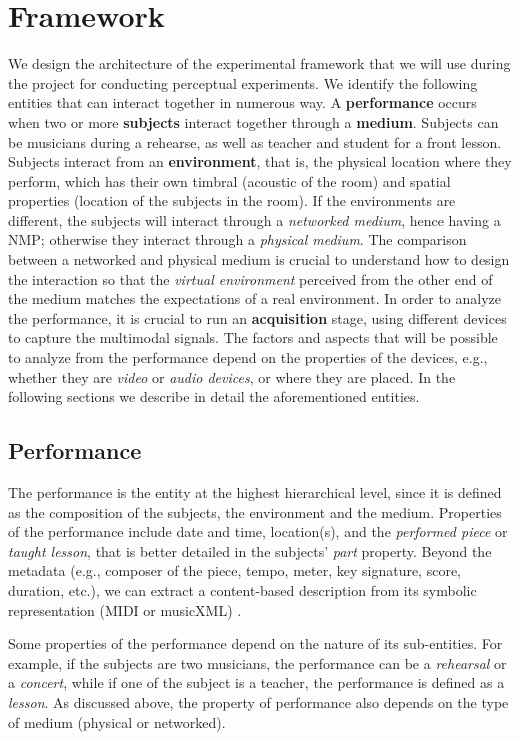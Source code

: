 \section{Framework}\label{sec:framework}
We design the architecture of the experimental framework that we will use during the project for conducting perceptual experiments. We identify the following entities that can interact together in numerous way. A \textbf{performance} occurs when two or more \textbf{subjects} interact together through a \textbf{medium}. Subjects can be musicians during a rehearse, as well as teacher and student for a front lesson. Subjects interact from an \textbf{environment}, that is, the physical location where they perform, which has their own timbral (acoustic of the room) and spatial properties (location of the subjects in the room). If the environments are different, the subjects will interact through a \textit{networked medium}, hence having a NMP; otherwise they interact through a \textit{physical medium}. The comparison between a networked and physical medium is crucial to understand how to design the interaction so that the \textit{virtual environment} perceived from the other end of the medium matches the expectations of a real environment. In order to analyze the performance, it is crucial to run an \textbf{acquisition} stage, using different devices to capture the multimodal signals. The factors and aspects that will be possible to analyze from the performance depend on the properties of the devices, e.g., whether they are \textit{video} or \textit{audio devices}, or where they are placed. In the following sections we describe in detail the aforementioned entities.

\subsection{Performance}
The performance is the entity at the highest hierarchical level, since it is defined as the composition of the subjects, the environment and the medium. 
Properties of the performance include date and time, location(s), and the \textit{performed piece} or \textit{taught lesson}, that is better detailed in the subjects' \textit{part} property. Beyond the metadata (e.g., composer of the piece, tempo, meter, key signature, score, duration, etc.), we can extract a content-based description from its symbolic representation (MIDI or musicXML) \cite{MIDItoolbox}.

Some properties of the performance depend on the nature of its sub-entities. For example, if the subjects are two musicians, the performance can be a \textit{rehearsal} or a \textit{concert}, while if one of the subject is a teacher, the performance is defined as a \textit{lesson}. As discussed above, the property of performance also depends on the type of medium (physical or networked).  

